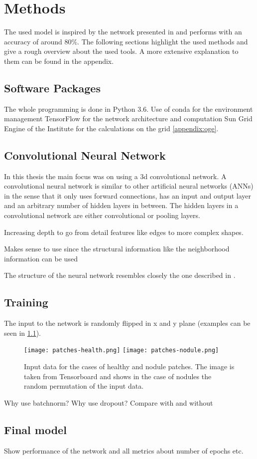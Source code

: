 \documentclass[main.tex]{subfiles}
\begin{document}
\chapter{Methods}
The used model is inspired by the network presented in \cite{huang2017lung} and performs with an accuracy of around 80$\%$. The following sections highlight the used methods and give a rough overview about the used tools. A more extensive explanation to them can be found in the appendix.


\section{Software Packages}
The whole programming is done in Python 3.6. 
Use of conda for the environment management 
TensorFlow for the network architecture and computation
Sun Grid Engine of the Institute for the calculations on the grid \ref{appendix:oge}.


\section{Convolutional Neural Network}
In this thesis the main focus was on using a 3d convolutional network. A convolutional neural network is similar to other artificial neural networks (ANNs) in the sense that it only uses forward connections, has an input and output layer and an arbitrary number of hidden layers in between. The hidden layers in a convolutional network are either convolutional or pooling layers. 

Increasing depth to go from detail features like edges to more complex shapes.

Makes sense to use since the structural information like the neighborhood information can be used



The structure of the neural network resembles closely the one described in \cite{huang2017lung}. 



\section{Training}

The input to the network is randomly flipped in x and y plane (examples can be seen in \ref{fig:input}).

\begin{figure}
\begin{center}
\texttt{[image: patches-health.png]}
\texttt{[image: patches-nodule.png]}
\end{center}
\caption{Input data for the cases of healthy and nodule patches. The image is taken from Tensorboard and shows in the case of nodules the random permutation of the input data.}
\label{fig:input}
\end{figure}

Why use batchnorm?
Why use dropout?
Compare with and without

\section{Final model}
Show performance of the network and all metrics about number of epochs etc.
\end{document}
